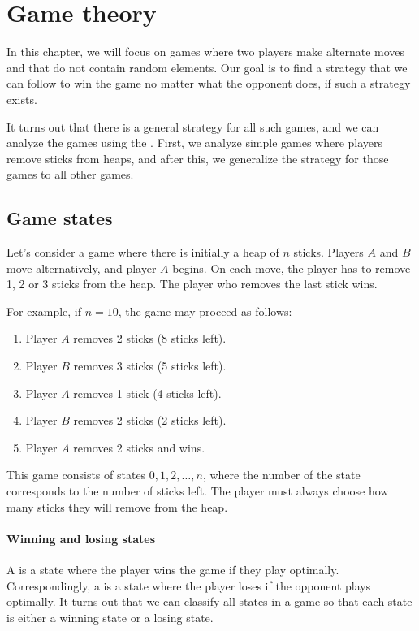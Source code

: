 \chapter{Game theory}

In this chapter, we will focus on games where
two players make alternate moves and that 
do not contain random elements.
Our goal is to find a strategy that we can
follow to win the game
no matter what the opponent does,
if such a strategy exists.

It turns out that there is a general strategy
for all such games,
and we can analyze the games using the .
First, we analyze simple games where
players remove sticks from heaps,
and after this, we generalize the strategy
for those games to all other games.

\section{Game states}

Let's consider a game where there is initially
a heap of $n$ sticks.
Players $A$ and $B$ move alternatively,
and player $A$ begins.
On each move, the player has to remove
1, 2 or 3 sticks from the heap.
The player who removes the last stick wins.

For example, if $n=10$, the game may proceed as follows:
\begin{enumerate}[noitemsep]
\item Player $A$ removes 2 sticks (8 sticks left).
\item Player $B$ removes 3 sticks (5 sticks left).
\item Player $A$ removes 1 stick (4 sticks left).
\item Player $B$ removes 2 sticks (2 sticks left).
\item Player $A$ removes 2 sticks and wins.
\end{enumerate}
This game consists of states $0,1,2,\ldots,n$,
where the number of the state corresponds to
the number of sticks left.
The player must always choose how many sticks
they will remove from the heap.

\subsubsection{Winning and losing states}


A  is a state where
the player wins the game if they
play optimally.
Correspondingly, a  is a state
where the player loses if the
opponent plays optimally.
It turns out that we can classify all states
in a game so that each state is either
a winning state or a losing state.

